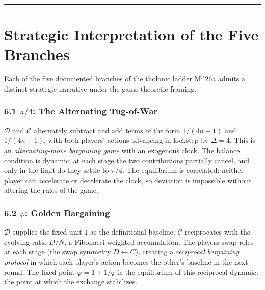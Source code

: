 \documentclass[12pt]{article}
\begin{document}
\begin{center}\rule{0.5\linewidth}{0.5pt}\end{center}

\section{Strategic Interpretation of the Five Branches}\label{strategic-interpretation-of-the-five-branches}

Each of the five documented branches of the tholonic ladder
\href{https://github.com/baardev/truevalue/blob/main/docnav/Research/papers/1_recursive-tholonic-five-constants/1_recursive-tholonic-five-constants.pdf}{Mil26a}
admits a distinct strategic narrative under the game-theoretic framing.

\subsubsection{\texorpdfstring{6.1 \(\pi/4\): The Alternating
Tug-of-War}{6.1 \textbackslash pi/4: The Alternating Tug-of-War}}\label{pi4-the-alternating-tug-of-war}

\(\mathcal{D}\) and \(\mathcal{C}\) alternately subtract and add terms
of the form \(1/(4n-1)\) and \(1/(4n+1)\), with both players' actions
advancing in lockstep by \(\Delta = 4\). This is an
\emph{alternating-move bargaining game} with an exogenous clock. The
balance condition is dynamic: at each stage the two contributions
partially cancel, and only in the limit do they settle to \(\pi/4\). The
equilibrium is correlated: neither player can accelerate or decelerate
the clock, so deviation is impossible without altering the rules of the
game.

\subsubsection{\texorpdfstring{6.2 \(\varphi\): Golden
Bargaining}{6.2 \textbackslash varphi: Golden Bargaining}}\label{varphi-golden-bargaining}

\(\mathcal{D}\) supplies the fixed unit \(1\) as the definitional
baseline; \(\mathcal{C}\) reciprocates with the evolving ratio \(D/N\),
a Fibonacci-weighted accumulation. The players swap roles at each stage
(the swap symmetry \(D \leftarrow C\)), creating a \emph{reciprocal
bargaining protocol} in which each player's action becomes the other's
baseline in the next round. The fixed point \(\varphi = 1 + 1/\varphi\)
is the equilibrium of this reciprocal dynamic: the point at which the
exchange stabilizes.
\end{document}
